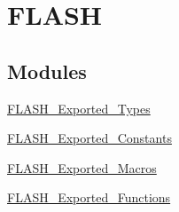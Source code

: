 \hypertarget{group__FLASH}{
\section{FLASH}
\label{group__FLASH}
}
\subsection*{Modules}
\begin{DoxyCompactItemize}
\item 
\hyperlink{group__FLASH__Exported__Types}{FLASH\_\-Exported\_\-Types}
\item 
\hyperlink{group__FLASH__Exported__Constants}{FLASH\_\-Exported\_\-Constants}
\item 
\hyperlink{group__FLASH__Exported__Macros}{FLASH\_\-Exported\_\-Macros}
\item 
\hyperlink{group__FLASH__Exported__Functions}{FLASH\_\-Exported\_\-Functions}
\end{DoxyCompactItemize}
